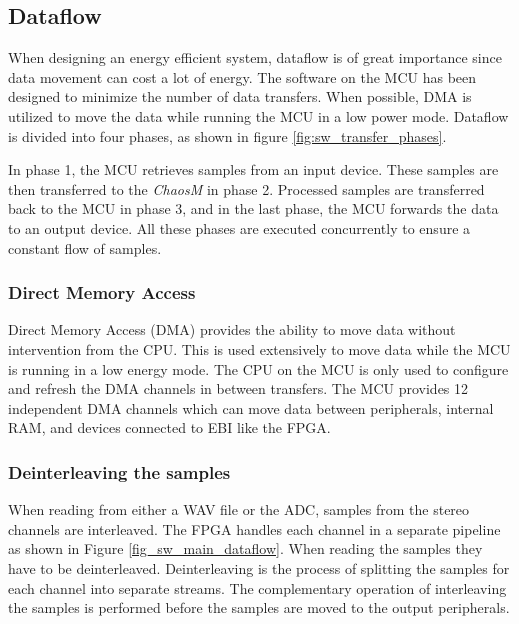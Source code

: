 
\subsection{Dataflow}

When designing an energy efficient system, dataflow is of great importance since
data movement can cost a lot of energy. The software on the MCU
has been designed to minimize the number of data transfers. When
possible, DMA is utilized to move the data while running the MCU in a low power
mode. Dataflow is divided into four phases, as shown in figure
\ref{fig:sw_transfer_phases}.

In phase 1, the MCU retrieves samples from an input device. These samples
are then transferred to the \textit{ChaosM} in phase 2. Processed samples are transferred back to the MCU in phase 3, and in the
last phase, the MCU forwards the data to an output device. All these
phases are executed concurrently to ensure a constant flow of samples.



\subsubsection{Direct Memory Access}

Direct Memory Access (DMA) provides the ability to move data without
intervention from the CPU. This is used extensively to move data while the
MCU is running in a low energy mode. The CPU on the MCU is only used to
configure and refresh the DMA channels in between transfers. The MCU provides 12
independent DMA channels which can move data between peripherals, internal RAM,
and devices connected to EBI like the FPGA.

% 

\subsubsection{Deinterleaving the samples}

When reading from either a WAV file or the ADC, samples from the stereo channels
are interleaved. The FPGA handles each channel in a separate pipeline as shown
in Figure \ref{fig_sw_main_dataflow}. When reading the samples they have to be
deinterleaved. Deinterleaving is the process of splitting the samples for each
channel into separate streams. The complementary operation of interleaving the
samples is performed before the samples are moved to the output peripherals.

